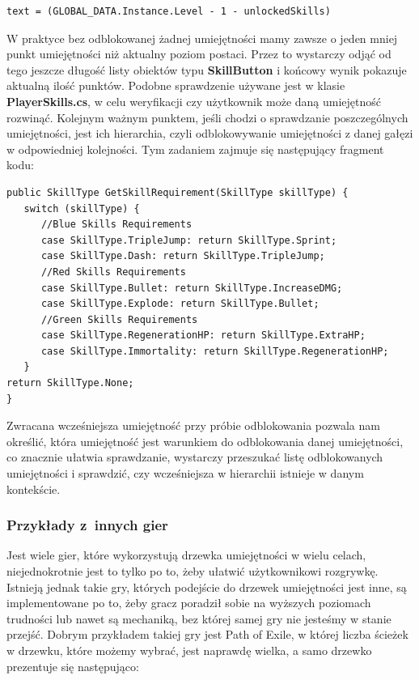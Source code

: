 \documentclass[oneside,polski,logo]{amuthesis}
\begin{document}
\begin{lstlisting}[breaklines=true,
language={[Sharp]C},
rulecolor=\color{blue!80!black},
caption={Fragment klasy \texttt{UI\_SkillTree.cs}}
]    
text = (GLOBAL_DATA.Instance.Level - 1 - unlockedSkills)
\end{lstlisting}

W praktyce bez odblokowanej żadnej umiejętności mamy zawsze o jeden mniej punkt umiejętności niż aktualny poziom postaci. Przez to wystarczy odjąć od tego jeszcze długość listy obiektów typu \textbf{SkillButton} i końcowy wynik pokazuje aktualną ilość punktów. Podobne sprawdzenie używane jest w klasie \textbf{PlayerSkills.cs}, w celu weryfikacji czy użytkownik może daną umiejętność rozwinąć. Kolejnym ważnym punktem, jeśli chodzi o sprawdzanie poszczególnych umiejętności, jest ich hierarchia, czyli odblokowywanie umiejętności z danej gałęzi w odpowiedniej kolejności. Tym zadaniem zajmuje się następujący fragment kodu:

\newpage
\begin{lstlisting}[breaklines=true,
language={[Sharp]C},
rulecolor=\color{blue!80!black},
caption={Fragment klasy \texttt{PlayerSkills.cs}}
]    
public SkillType GetSkillRequirement(SkillType skillType) {
   switch (skillType) {
      //Blue Skills Requirements
      case SkillType.TripleJump: return SkillType.Sprint;
      case SkillType.Dash: return SkillType.TripleJump;
      //Red Skills Requirements
      case SkillType.Bullet: return SkillType.IncreaseDMG;
      case SkillType.Explode: return SkillType.Bullet;
      //Green Skills Requirements
      case SkillType.RegenerationHP: return SkillType.ExtraHP;
      case SkillType.Immortality: return SkillType.RegenerationHP;
   }
return SkillType.None;
}
\end{lstlisting}

Zwracana wcześniejsza umiejętność przy próbie odblokowania pozwala nam określić, która umiejętność jest warunkiem do odblokowania danej umiejętności, co znacznie ułatwia sprawdzanie, wystarczy przeszukać listę odblokowanych umiejętności i sprawdzić, czy wcześniejsza w hierarchii istnieje w danym kontekście.

\subsubsection{Przykłady z~innych gier}
Jest wiele gier, które wykorzystują drzewka umiejętności w wielu celach, niejednokrotnie jest to tylko po to, żeby ułatwić użytkownikowi rozgrywkę. Istnieją jednak takie gry, których podejście do drzewek umiejętności jest inne, są implementowane po to, żeby gracz poradził sobie na wyższych poziomach trudności lub nawet są mechaniką, bez której samej gry nie jesteśmy w stanie przejść. Dobrym przykładem takiej gry jest Path of Exile, w której liczba ścieżek w drzewku, które możemy wybrać, jest naprawdę wielka, a samo drzewko prezentuje się następująco:
\end{document}
